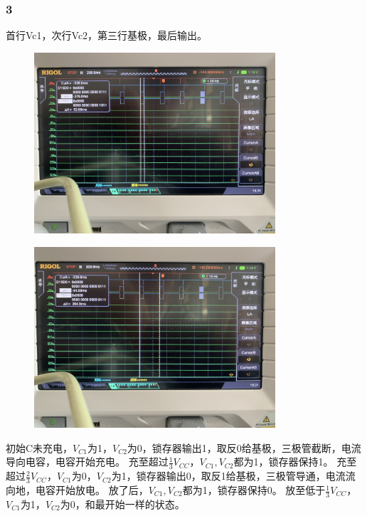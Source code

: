 \documentclass[UTF8, a4paper, 11pt]{article}
\begin{document}
\subsubsection{3}
首行Vc1，次行Vc2，第三行基极，最后输出。
\begin{figure}[H]
    \centering
    \includegraphics[width=0.8\textwidth]{3.png}
\end{figure}
\begin{figure}[H]
    \centering
    \includegraphics[width=0.8\textwidth]{4.png}
\end{figure}
初始C未充电，$V_{C1}$为1，$V_{C2}$为0，锁存器输出1，取反0给基极，三极管截断，电流导向电容，电容开始充电。
充至超过$\frac13V_{CC}$，$V_{C1},V_{C2}$都为1，锁存器保持1。
充至超过$\frac23V_{CC}$，$V_{C1}$为0，$V_{C2}$为1，锁存器输出0，取反1给基极，三极管导通，电流流向地，电容开始放电。
放了后，$V_{C1},V_{C2}$都为1，锁存器保持0。
放至低于$\frac13V_{CC}$，$V_{C1}$为1，$V_{C2}$为0，和最开始一样的状态。
\end{document}
